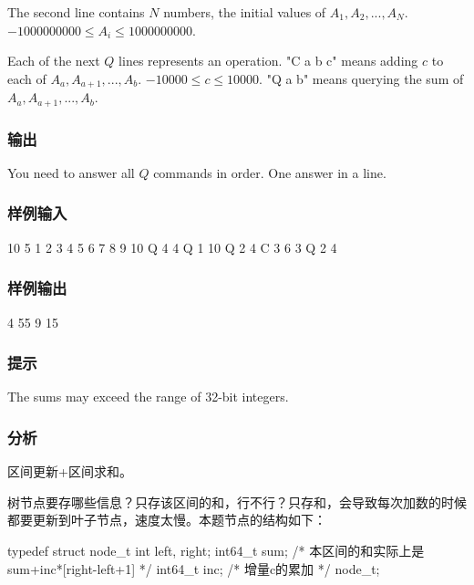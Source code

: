 The second line contains $N$ numbers, the initial values of $A_1, A_2, ... , A_N$. $-1000000000 \leq A_i \leq 1000000000$.

Each of the next $Q$ lines represents an operation.
"C a b c" means adding $c$ to each of $A_a, A_{a+1}, ... , A_b$. $-10000 ≤ c ≤ 10000$.
"Q a b" means querying the sum of $A_a, A_{a+1}, ... , A_b$.

\subsubsection{输出}
You need to answer all $Q$ commands in order. One answer in a line.

\subsubsection{样例输入}
\begin{Code}
10 5
1 2 3 4 5 6 7 8 9 10
Q 4 4
Q 1 10
Q 2 4
C 3 6 3
Q 2 4
\end{Code}

\subsubsection{样例输出}
\begin{Code}
4
55
9
15
\end{Code}

\subsubsection{提示}
The sums may exceed the range of 32-bit integers.

\subsubsection{分析}
区间更新+区间求和。

树节点要存哪些信息？只存该区间的和，行不行？只存和，会导致每次加数的时候都要更新到叶子节点，速度太慢。本题节点的结构如下：
\begin{Code}
typedef struct node_t {
    int left, right;
    int64_t sum;  /* 本区间的和实际上是sum+inc*[right-left+1] */
    int64_t inc;  /* 增量c的累加 */
} node_t;
\end{Code}

